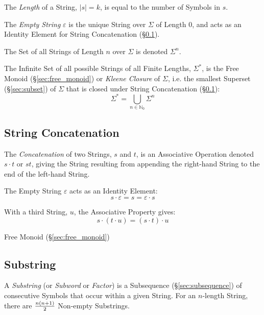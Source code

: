 The \emph{Length} of a String, $|s| = k$, is equal to the number of
Symbols in $s$.

The \emph{Empty String} $\varepsilon$ is the unique String over
$\Sigma$ of Length 0, and acts as an Identity Element for String
Concatenation (\S\ref{sec:string_concatenation}).

The Set of all Strings of Length $n$ over $\Sigma$ is denoted
$\Sigma^n$.

The Infinite Set of all possible Strings of all Finite Lengths,
$\Sigma^*$, is the Free Monoid (\S\ref{sec:free_monoid}) or
\emph{Kleene Closure} of $\Sigma$, i.e. the smallest Superset
(\S\ref{sec:subset}) of $\Sigma$ that is closed under String
Concatenation (\S\ref{sec:string_concatenation}):
\[
  \Sigma^* = \bigcup_{n\in\mathbb{N}_0} \Sigma^n
\]



\subsection{String Concatenation}\label{sec:string_concatenation}

The \emph{Concatenation} of two Strings, $s$ and $t$, is an
Associative Operation denoted $s \cdot t$ or $st$, giving the String
resulting from appending the right-hand String to the end of the
left-hand String.

The Empty String $\varepsilon$ acts as an Identity Element:
\[
  s \cdot \varepsilon = s = \varepsilon \cdot s
\]

With a third String, $u$, the Associative Property gives:
\[
  s \cdot (t \cdot u) = (s \cdot t) \cdot u
\]

Free Monoid (\S\ref{sec:free_monoid})



\subsection{Substring}\label{sec:substring}

A \emph{Substring} (or \emph{Subword} or \emph{Factor}) is a
Subsequence (\S\ref{sec:subsequence}) of consecutive Symbols that
occur within a given String. For an $n$-length String, there are
$n(n+1) \over 2$ Non-empty Substrings.



